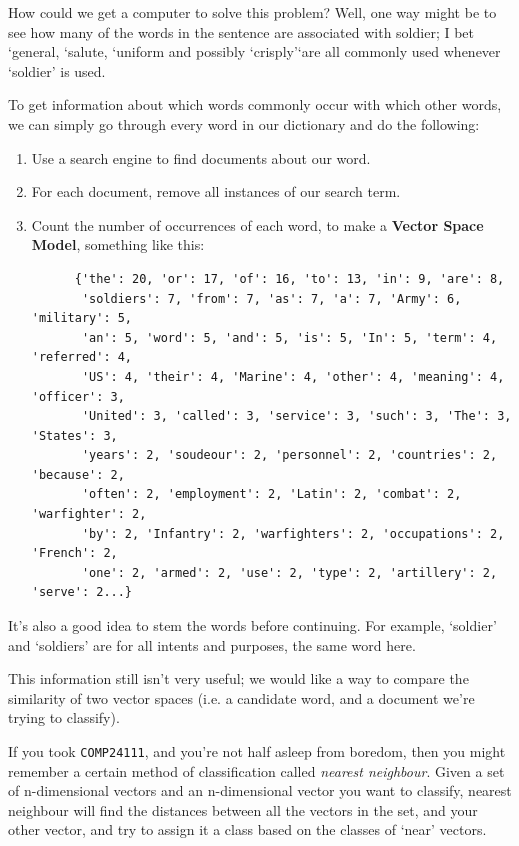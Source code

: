 How could we get a computer to solve this problem? Well, one way might be to see
how many of the words in the sentence are associated with soldier; I bet
`general, `salute, `uniform and possibly `crisply'`are all commonly used
whenever `soldier' is used.

To get information about which words commonly occur with which other words, we
can simply go through every word in our dictionary and do the following:

\begin{enumerate}
  \item Use a search engine to find documents about our word.
  \item For each document, remove all instances of our search term.
  \item Count the number of occurrences of each word, to make a \textbf{Vector 
    Space Model}, something like this:
    \begin{verbatim}
      {'the': 20, 'or': 17, 'of': 16, 'to': 13, 'in': 9, 'are': 8,
       'soldiers': 7, 'from': 7, 'as': 7, 'a': 7, 'Army': 6, 'military': 5,
       'an': 5, 'word': 5, 'and': 5, 'is': 5, 'In': 5, 'term': 4, 'referred': 4,
       'US': 4, 'their': 4, 'Marine': 4, 'other': 4, 'meaning': 4, 'officer': 3,
       'United': 3, 'called': 3, 'service': 3, 'such': 3, 'The': 3, 'States': 3,
       'years': 2, 'soudeour': 2, 'personnel': 2, 'countries': 2, 'because': 2,
       'often': 2, 'employment': 2, 'Latin': 2, 'combat': 2, 'warfighter': 2,
       'by': 2, 'Infantry': 2, 'warfighters': 2, 'occupations': 2, 'French': 2,
       'one': 2, 'armed': 2, 'use': 2, 'type': 2, 'artillery': 2, 'serve': 2...}
    \end{verbatim}
\end{enumerate}

It's also a good idea to stem the words before continuing. For example,
`soldier' and `soldiers' are for all intents and purposes, the same word here.

This information still isn't very useful; we would like a way to compare the
similarity of two vector spaces (i.e. a candidate word, and a document we're
trying to classify).

If you took \texttt{COMP24111}, and you're not half asleep from boredom, then
you might remember a certain method of classification called \textit{nearest
neighbour}. Given a set of n-dimensional vectors and an n-dimensional vector you
want to classify, nearest neighbour will find the distances between all the
vectors in the set, and your other vector, and try to assign it a class based on
the classes of `near' vectors.

